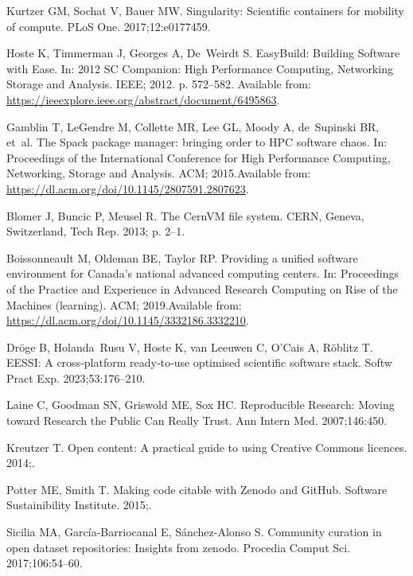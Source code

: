 \documentclass[11pt]{article}
\begin{document}
\begin{thebibliography}{10}
Kurtzer GM, Sochat V, Bauer MW.
\newblock Singularity: Scientific containers for mobility of compute.
\newblock PLoS One. 2017;12:e0177459.

Hoste K, Timmerman J, Georges A, De~Weirdt S.
\newblock EasyBuild: Building Software with Ease.
\newblock In: 2012 SC Companion: High Performance Computing, Networking Storage
  and Analysis. IEEE; 2012. p. 572--582.
\newblock Available from:
  \url{https://ieeexplore.ieee.org/abstract/document/6495863}.

Gamblin T, LeGendre M, Collette MR, Lee GL, Moody A, de~Supinski BR, et~al.
\newblock The Spack package manager: bringing order to {HPC} software chaos.
\newblock In: Proceedings of the International Conference for High Performance
  Computing, Networking, Storage and Analysis. ACM; 2015.Available from:
  \url{https://dl.acm.org/doi/10.1145/2807591.2807623}.

Blomer J, Buncic P, Meusel R.
\newblock The {CernVM} file system.
\newblock CERN, Geneva, Switzerland, Tech Rep. 2013; p. 2--1.

Boissonneault M, Oldeman BE, Taylor RP.
\newblock Providing a unified software environment for Canada's national
  advanced computing centers.
\newblock In: Proceedings of the Practice and Experience in Advanced Research
  Computing on Rise of the Machines (learning). ACM; 2019.Available from:
  \url{https://dl.acm.org/doi/10.1145/3332186.3332210}.

Dröge B, Holanda~Rusu V, Hoste K, van Leeuwen C, O'Cais A, Röblitz T.
\newblock EESSI: A cross‐platform ready‐to‐use optimised scientific
  software stack.
\newblock Softw Pract Exp. 2023;53:176--210.

Laine C, Goodman SN, Griswold ME, Sox HC.
\newblock Reproducible Research: Moving toward Research the Public Can Really
  Trust.
\newblock Ann Intern Med. 2007;146:450.

Kreutzer T.
\newblock Open content: A practical guide to using Creative Commons licences.
  2014;.

Potter ME, Smith T.
\newblock Making code citable with Zenodo and GitHub.
\newblock Software Sustainibility Institute. 2015;.

Sicilia MA, García-Barriocanal E, Sánchez-Alonso S.
\newblock Community curation in open dataset repositories: Insights from
  zenodo.
\newblock Procedia Comput Sci. 2017;106:54--60.


\end{thebibliography}
\end{document}
